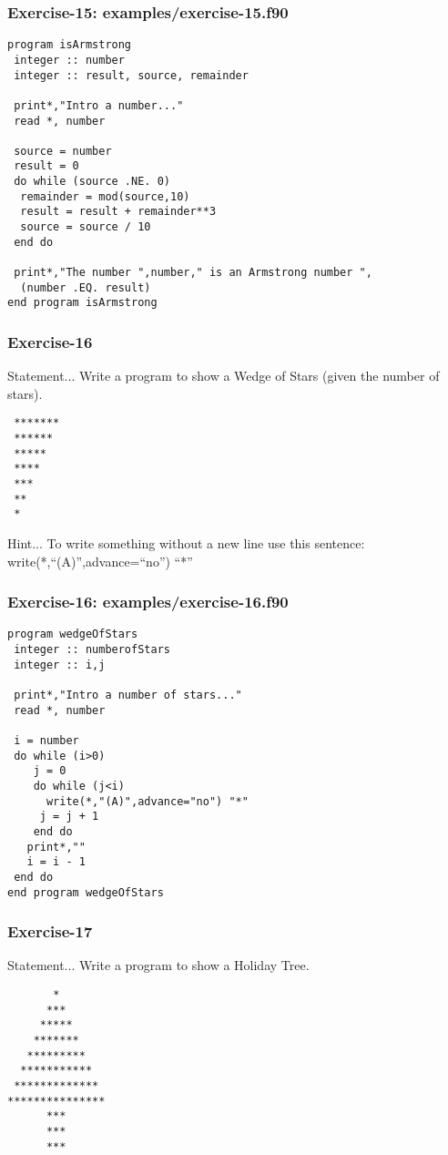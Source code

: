\documentclass[xcolor=dvipsnames,dvip,notes=show,table]{beamer}
\begin{document}
\begin{frame}[fragile]
\frametitle{Exercise-15: examples/exercise-15.f90}
\scriptsize
\begin{lstlisting}
program isArmstrong
 integer :: number
 integer :: result, source, remainder

 print*,"Intro a number..."
 read *, number

 source = number
 result = 0
 do while (source .NE. 0)
  remainder = mod(source,10)
  result = result + remainder**3
  source = source / 10
 end do

 print*,"The number ",number," is an Armstrong number ",  
  (number .EQ. result)
end program isArmstrong
\end{lstlisting}
\end{frame}


\begin{frame}[fragile]
\frametitle{Exercise-16}
\begin{block}{Statement...}
 Write a program to show a Wedge of Stars (given the number of stars).
\end{block}


\begin{lstlisting}
 *******
 ******
 *****
 ****
 ***
 **
 *
\end{lstlisting}

\begin{block}{Hint...}
 To write something without a new line use this sentence: write(*,``(A)'',advance=``no'') ``*''
\end{block}


\end{frame}


\begin{frame}[fragile]
\frametitle{Exercise-16: examples/exercise-16.f90}
\scriptsize
\begin{lstlisting}
program wedgeOfStars
 integer :: numberofStars
 integer :: i,j

 print*,"Intro a number of stars..."
 read *, number

 i = number
 do while (i>0)
	j = 0
	do while (j<i)
	  write(*,"(A)",advance="no") "*"
	 j = j + 1
	end do
   print*,""
   i = i - 1
 end do
end program wedgeOfStars
\end{lstlisting}
\end{frame}



\begin{frame}[fragile]
\frametitle{Exercise-17}
\begin{block}{Statement...}
 Write a program to show a Holiday Tree.
\end{block}

\begin{lstlisting}
       *
      ***
     *****
    *******
   *********
  ***********
 *************
***************
      ***
      ***
      ***
\end{lstlisting}



\end{frame}
\end{document}
